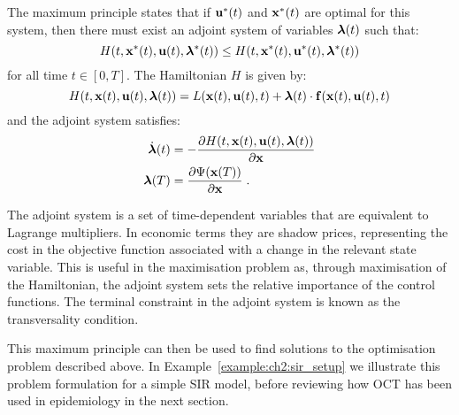 The maximum principle states that if $\mathbf{\bm{u}}^*(t)$ and $\mathbf{\bm{x}}^*(t)$ are optimal for this system, then there must exist an adjoint system of variables $\mathbf{\bm{\lambda}}(t)$ such that:
\begin{equation}
    H(t, \mathbf{\bm{x}}^*(t), \mathbf{\bm{u}}(t), \mathbf{\bm{\lambda}}^*(t)) \leq H(t, \mathbf{\bm{x}}^*(t), \mathbf{\bm{u}}^*(t), \mathbf{\bm{\lambda}}^*(t))
\end{equation}
for all time $t \in \left[0, T\right]$. The Hamiltonian $H$ is given by:
\begin{equation}\label{eqn:ch2:hamiltonian_general}
    H(t, \mathbf{\bm{x}}(t), \mathbf{\bm{u}}(t), \mathbf{\bm{\lambda}}(t)) = L(\mathbf{\bm{x}}(t), \mathbf{\bm{u}}(t), t) + \mathbf{\bm{\lambda}}(t)\cdot\mathbf{\bm{f}}(\mathbf{\bm{x}}(t), \mathbf{\bm{u}}(t), t)
\end{equation}
and the adjoint system satisfies:
\begin{subequations}\label{eqn:ch2:adjoint_system}
    \begin{align}
        \dot{\mathbf{\bm{\lambda}}}(t) &= -\frac{\partial H(t, \mathbf{\bm{x}}(t), \mathbf{\bm{u}}(t), \mathbf{\bm{\lambda}}(t))}{\partial \mathbf{\bm{x}}} \label{eqn:ch2:adjoint_system_a}\\
        \mathbf{\bm{\lambda}}(T) &= \frac{\partial \Psi(\mathbf{\bm{x}}(T))}{\partial \mathbf{\bm{x}}}\;. \label{eqn:ch2:adjoint_system_b}
    \end{align}
\end{subequations}

The adjoint system is a set of time-dependent variables that are equivalent to Lagrange multipliers. In economic terms they are shadow prices, representing the cost in the objective function associated with a change in the relevant state variable. This is useful in the maximisation problem as, through maximisation of the Hamiltonian, the adjoint system sets the relative importance of the control functions. The terminal constraint in the adjoint system is known as the transversality condition. 

This maximum principle can then be used to find solutions to the optimisation problem described above. In Example~\ref{example:ch2:sir_setup} we illustrate this problem formulation for a simple SIR model, before reviewing how OCT has been used in epidemiology in the next section. 

